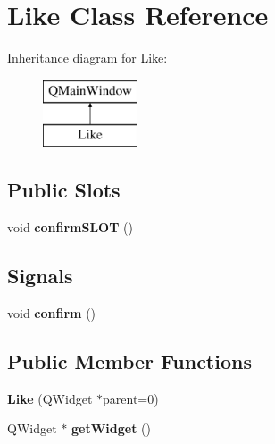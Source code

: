 \hypertarget{class_like}{}\section{Like Class Reference}
\label{class_like}
Inheritance diagram for Like\+:\begin{figure}[H]
\begin{center}
\leavevmode
\includegraphics[height=2.000000cm]{class_like}
\end{center}
\end{figure}
\subsection*{Public Slots}
\begin{DoxyCompactItemize}
\item 
void {\bfseries confirm\+S\+L\+OT} ()\hypertarget{class_like_ac5d54e3f22e4ca359c796bb8b3ee02de}{}\label{class_like_ac5d54e3f22e4ca359c796bb8b3ee02de}

\end{DoxyCompactItemize}
\subsection*{Signals}
\begin{DoxyCompactItemize}
\item 
void {\bfseries confirm} ()\hypertarget{class_like_a9c2b32bf16e5a26749783bc24c99d402}{}\label{class_like_a9c2b32bf16e5a26749783bc24c99d402}

\end{DoxyCompactItemize}
\subsection*{Public Member Functions}
\begin{DoxyCompactItemize}
\item 
{\bfseries Like} (Q\+Widget $\ast$parent=0)\hypertarget{class_like_a1e6dca63e0a3c7b7b1fdcf4b4d832167}{}\label{class_like_a1e6dca63e0a3c7b7b1fdcf4b4d832167}

\item 
Q\+Widget $\ast$ {\bfseries get\+Widget} ()\hypertarget{class_like_a502d5988becfb7b16b28a6c2966e8a63}{}\label{class_like_a502d5988becfb7b16b28a6c2966e8a63}

\end{DoxyCompactItemize}
